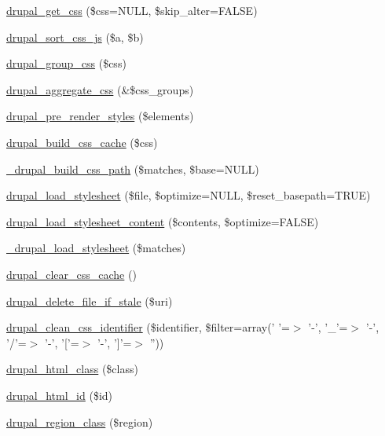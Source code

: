\begin{DoxyCompactItemize}
\item 
\hyperlink{common_8inc_a2e308371f339fbb54967045ccbe4e88c}{drupal\_\-get\_\-css} (\$css=NULL, \$skip\_\-alter=FALSE)
\item 
\hyperlink{common_8inc_abfb324a21b713b33d4e3b0eeed5343f3}{drupal\_\-sort\_\-css\_\-js} (\$a, \$b)
\item 
\hyperlink{common_8inc_a2d63a3ab0ae5c285f4546304a4775ae3}{drupal\_\-group\_\-css} (\$css)
\item 
\hyperlink{common_8inc_a7d2aaae18c944ab87b16de225927e330}{drupal\_\-aggregate\_\-css} (\&\$css\_\-groups)
\item 
\hyperlink{common_8inc_a4b3889176f5132daa3f56a861d19aa95}{drupal\_\-pre\_\-render\_\-styles} (\$elements)
\item 
\hyperlink{common_8inc_af375d76404efdf4468a7157f71c910ee}{drupal\_\-build\_\-css\_\-cache} (\$css)
\item 
\hyperlink{common_8inc_af634d8ae0731015c73e039895890b42b}{\_\-drupal\_\-build\_\-css\_\-path} (\$matches, \$base=NULL)
\item 
\hyperlink{common_8inc_a9c43f07915b6da92d97792c2b968a4cd}{drupal\_\-load\_\-stylesheet} (\$file, \$optimize=NULL, \$reset\_\-basepath=TRUE)
\item 
\hyperlink{common_8inc_a3103cf0e37656ce026267e14260d9ea6}{drupal\_\-load\_\-stylesheet\_\-content} (\$contents, \$optimize=FALSE)
\item 
\hyperlink{common_8inc_a79a5c2b6f50963f2e185b6c34d6bd10e}{\_\-drupal\_\-load\_\-stylesheet} (\$matches)
\item 
\hyperlink{common_8inc_ae89dbd2b41a6623be2ed704d039a5c7c}{drupal\_\-clear\_\-css\_\-cache} ()
\item 
\hyperlink{common_8inc_af70ef23972aa97b49877d5269c8f321c}{drupal\_\-delete\_\-file\_\-if\_\-stale} (\$uri)
\item 
\hyperlink{common_8inc_a71bc20ece521646a633b65868a441d26}{drupal\_\-clean\_\-css\_\-identifier} (\$identifier, \$filter=array(' '=$>$ '-\/', '\_\-'=$>$ '-\/', '/'=$>$ '-\/', '\mbox{[}'=$>$ '-\/', '\mbox{]}'=$>$ ''))
\item 
\hyperlink{common_8inc_aba9dd2b04e8c797c0f0edc9098cbbd48}{drupal\_\-html\_\-class} (\$class)
\item 
\hyperlink{common_8inc_accaa7f3e2e401747b19be982c9f90323}{drupal\_\-html\_\-id} (\$id)
\item 
\hyperlink{common_8inc_a601489210268565d75adb9af61643e6c}{drupal\_\-region\_\-class} (\$region)
\item 

\end{DoxyCompactItemize}
